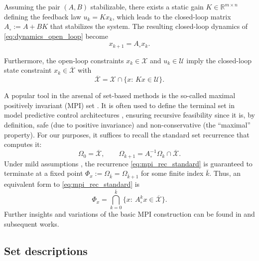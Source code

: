 \documentclass[journal,twoside,web]{ieeecolor}
\begin{document}
Assuming the pair $(A,B)$ stabilizable, there exists a static gain $K \in \mathbb{R}^{m \times n}$ defining the feedback law $u_k = Kx_k$, which leads to the closed-loop matrix $A_\circ := A + BK$ that stabilizes the system. The resulting closed-loop dynamics of \eqref{eq:dynamics_open_loop} become
\begin{equation}
\label{eq:LTI_dynamics_closed}
x_{k+1} = A_\circ x_k .
\end{equation}

Furthermore, the open-loop constraints $x_k \in \mathcal{X}$ and $u_k \in \mathcal{U}$ imply the closed-loop state constraint $x_k \in \overline{\mathcal{X}}$ with 
\begin{equation}
\label{eq:barx}
\overline{\mathcal{X}} = \mathcal{X} \cap \{x:\, Kx \in \mathcal{U}\}.
\end{equation}

A popular tool in the arsenal of set-based methods is the so-called maximal positively invariant (MPI) set \cite{gilbert1991linear,kolmanovsky_theory_nodate}. It is often used to define the terminal set in model predictive control architectures \cite{rakovic2018handbook}, ensuring recursive feasibility since it is, by definition, safe (due to positive invariance) and non-conservative (the ``maximal'' property). For our purposes, it suffices to recall the standard set recurrence that computes it:
\begin{equation}
\label{eq:mpi_rec_standard}
\Omega_0=\overline{\mathcal X}, 
\qquad 
\Omega_{k+1}=A_\circ^{-1}\Omega_k \cap \overline{\mathcal X}.
\end{equation}
Under mild assumptions \cite[Thm.~3]{rakovic2022implicit}, the recurrence \eqref{eq:mpi_rec_standard} is guaranteed to terminate at a fixed point $\Phi_x := \Omega_{\bar k}=\Omega_{\bar k+1}$ for some finite index $\bar k$. Thus, an equivalent form to \eqref{eq:mpi_rec_standard} is
\begin{equation}
    \label{eq:mpi_rec_standard_2}
    \Phi_x=\bigcap\limits_{k=0}^{\bar k} \bigl\{x:\: A_\circ^kx \in \overline{\mathcal X}\bigr\}.
\end{equation}
Further insights and variations of the basic MPI construction can be found in \cite{blanchini2008set,houska_polyhedral_2025} and subsequent works.

\subsection*{Set descriptions}
\end{document}
